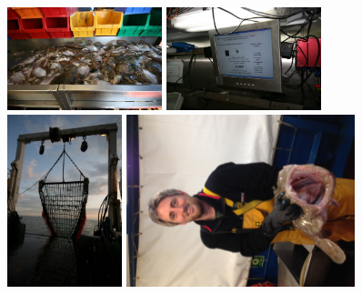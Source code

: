 \documentclass[xcolor=x11names,compress]{beamer}
\renewcommand{\(}{\begin{columns}}
\renewcommand{\)}{\end{columns}}
\newcommand{\<}[1]{\begin{column}{#1}}
\renewcommand{\>}{\end{column}}
\begin{document}
\begin{frame}
	\centering
	\includegraphics[height = 3cm]{IMG_9160}
	\includegraphics[height = 3cm]{IMG_9267} \\
	\includegraphics[height = 5cm]{IMG_9192}
	\includegraphics[height = 5cm]{Paul_Dolder}
\end{frame}
\end{document}
